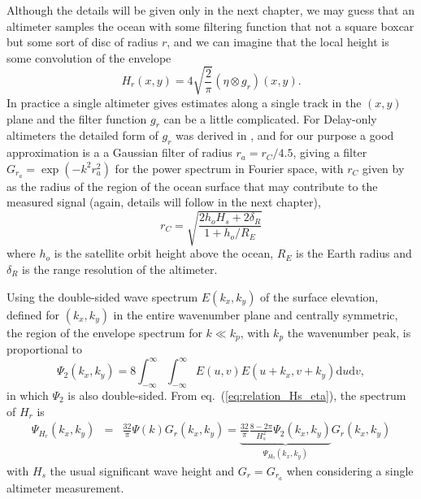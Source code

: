 {Although the details will be given only in the next chapter, we may guess that an altimeter samples the ocean with some filtering function that not a square boxcar but some sort of disc of radius $r$, and  we can imagine that the local height is some convolution of the envelope
\begin{equation}
    H_{r}(x,y) = 4\sqrt{\frac{2}{\pi}} (\eta \otimes g_{r})(x,y).
   \label{eq:relation_Hs_eta}
\end{equation}
In practice a single altimeter gives estimates along a single track in the $(x,y)$ plane and the filter function $g_r$ can be a little complicated. For Delay-only altimeters the detailed form of $g_r$ was derived in \cite{DeCarlo&al.2023}, and for our purpose a good approximation is a a Gaussian filter of radius $r_a=r_C/4.5$, giving a filter $G_{r_a}=\exp{(-k^2 r_a^2)}$ for the power spectrum in Fourier space, with $r_C$ given by \cite{Chelton&al.1989} as the radius of the region of the ocean surface that may contribute to the measured signal (again, details will follow in the next chapter), 
\begin{equation}
    r_C =\sqrt{\frac{ 2 h_o H_s+ 2 \delta_R}{1+h_o/R_E}} \label{eq:rC}
\end{equation}
where $h_o$ is the satellite orbit height above the ocean, $R_E$ is the Earth radius and $\delta_R$ is the range resolution of the altimeter.  
 
 
Using the double-sided wave spectrum $E(k_x,k_y)$ of the surface elevation, defined for $(k_x,k_y)$ in the entire wavenumber plane and centrally symmetric, the region of the envelope spectrum for $k \ll k_p$, with $k_p$ the wavenumber peak, is 
proportional to
\begin{equation}
    \Psi_{2}(k_x,k_y) = 8 \int_{-\infty}^\infty 
    \int_{-\infty}^\infty
E(u,v)E(u+k_x,v+k_y)\mathrm{d}u \mathrm{d}v,
\end{equation}
in which $\Psi_{2}$ is also double-sided. From  eq.~(\ref{eq:relation_Hs_eta}), the spectrum of $H_r$ is
\begin{eqnarray}
\Psi_{H_r}(k_x,k_y) &= & \frac{32}{\pi}  \Psi(k)  G_{r}(k_x,k_y) =  \underbrace{\frac{32}{\pi} \frac{8 - 2\pi}{H_s^2}   \Psi_2(k_x,k_y)}_{\Psi_{H_0}(k_x,k_y)}  G_{r}(k_x,k_y)\label{eq:eq2_inFourier}
\end{eqnarray}
with $H_s$ the usual significant wave height and $G_{r}=G_{r_a}$ when considering a single altimeter measurement.

}
